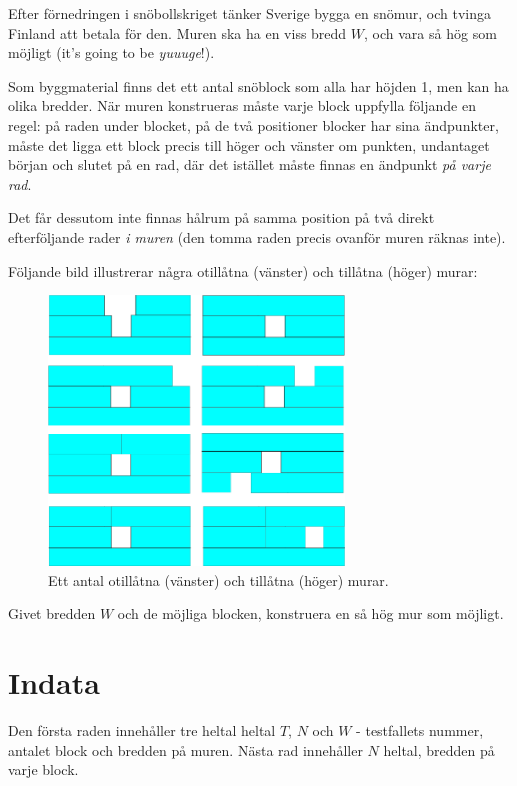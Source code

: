 Efter förnedringen i snöbollskriget tänker Sverige bygga en snömur, och tvinga Finland att betala för den.
Muren ska ha en viss bredd $W$, och vara så hög som möjligt (it's going to be \emph{yuuuge}!).

Som byggmaterial finns det ett antal snöblock som alla har höjden 1, men kan ha olika bredder.
När muren konstrueras måste varje block uppfylla följande en regel: på raden under blocket,
på de två positioner blocker har sina ändpunkter, måste det ligga ett block precis till höger och vänster om punkten,
undantaget början och slutet på en rad, där det istället måste finnas en ändpunkt \emph{på varje rad}.

Det får dessutom inte finnas hålrum på samma position på två direkt efterföljande rader \emph{i muren} (den tomma raden
precis ovanför muren räknas inte).

Följande bild illustrerar några otillåtna (vänster) och tillåtna (höger) murar:

\begin{figure}[h]
	\centering
	\includegraphics[width=0.7\textwidth]{mur.png}
	\caption{Ett antal otillåtna (vänster) och tillåtna (höger) murar.}
\end{figure}

Givet bredden $W$ och de möjliga blocken, konstruera en så hög mur som möjligt.

\section*{Indata}
Den första raden innehåller tre heltal heltal $T$, $N$ och $W$ - testfallets nummer, antalet block och bredden på muren.
Nästa rad innehåller $N$ heltal, bredden på varje block.


